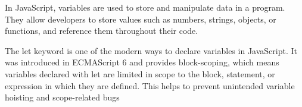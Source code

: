 
In JavaScript, variables are used to store and manipulate data in a program. They allow developers to store values such as numbers, 
strings, objects, or functions, and reference them throughout their code.

The let keyword is one of the modern ways to declare variables in JavaScript. It was introduced in ECMAScript 6  and provides 
block-scoping, which means variables declared with let are limited in scope to the block, statement, or expression in which they are 
defined. This helps to prevent unintended variable hoisting and scope-related bugs
